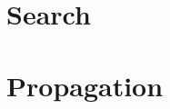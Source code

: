 \documentclass[CS4402-Notes.tex]{subfiles}
\begin{document}
\section{Search}



\section{Propagation}
\end{document}
